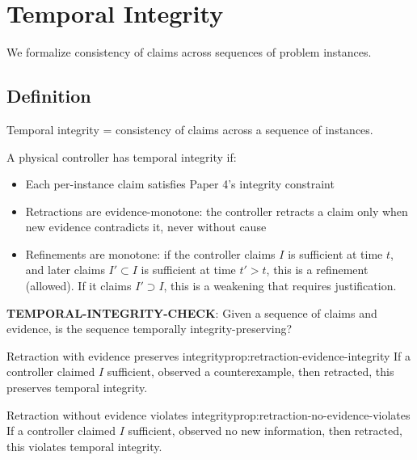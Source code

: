 \section{Temporal Integrity}\label{sec:temporal-integrity}

We formalize consistency of claims across sequences of problem instances.

\subsection{Definition}

\begin{definition}\label{def:temporal-integrity}
Temporal integrity = consistency of claims across a sequence of instances.

A physical controller has temporal integrity if:
\begin{itemize}
\item Each per-instance claim satisfies Paper 4's integrity constraint
\item Retractions are evidence-monotone: the controller retracts a claim only when new evidence contradicts it, never without cause
\item Refinements are monotone: if the controller claims $I$ is sufficient at time $t$, and later claims $I' \subset I$ is sufficient at time $t' > t$, this is a refinement (allowed). If it claims $I' \supset I$, this is a weakening that requires justification.
\end{itemize}
\end{definition}

\begin{decision}\label{dec:temporal-integrity-check}
\textbf{TEMPORAL-INTEGRITY-CHECK}: Given a sequence of claims and evidence, is the sequence temporally integrity-preserving?
\end{decision}

\begin{claim}{Retraction with evidence preserves integrity}{prop:retraction-evidence-integrity}
If a controller claimed $I$ sufficient, observed a counterexample, then retracted, this preserves temporal integrity.
\end{claim}


\begin{claim}{Retraction without evidence violates integrity}{prop:retraction-no-evidence-violates}
If a controller claimed $I$ sufficient, observed no new information, then retracted, this violates temporal integrity.
\end{claim}

